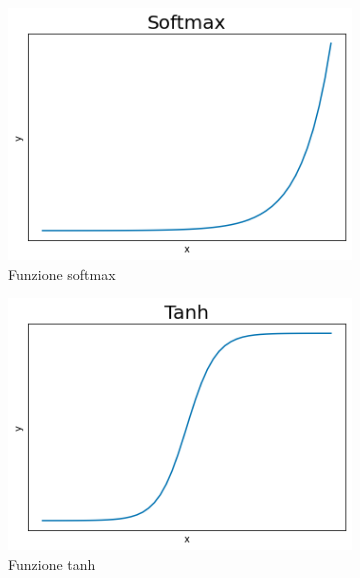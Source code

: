 \documentclass[../../main.tex]{subfiles}
\begin{document}
\begin{figure}[H]
    \centering
    \begin{subfigure}[t]{0.49\textwidth}
        \centering
        \includegraphics[width = \textwidth]{immagini/4_2/softmax.png}
        \caption{Funzione softmax}
        \label{fig:softmax}
    \end{subfigure}
    \begin{subfigure}[t]{0.49\textwidth}
        \centering
        \includegraphics[width = \textwidth]{immagini/4_2/tanh.png}      
        \caption{Funzione tanh}  
        \label{fig:tanh}
    \end{subfigure}
    \caption{}
\end{figure}
\end{document}
